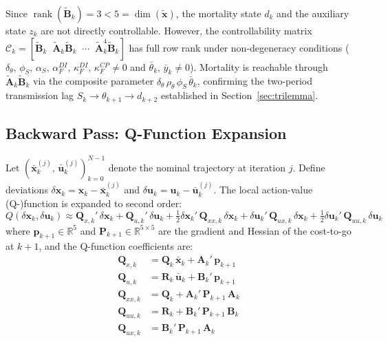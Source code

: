 \documentclass[12pt, a4paper]{article}
\begin{document}
Since $\operatorname{rank}(\tilde{\bm{B}}_k) = 3 < 5 = \dim(\tilde{\bm{x}})$,
the mortality state $d_k$ and the auxiliary state $z_k$ are not directly
controllable. However, the controllability matrix
$\mathcal{C}_k = [\tilde{\bm{B}}_k \;\; \tilde{\bm{A}}_k\tilde{\bm{B}}_k
\;\; \cdots \;\; \tilde{\bm{A}}_k^4\tilde{\bm{B}}_k]$ has full row rank under
non-degeneracy conditions ($\delta_\theta,\, \phi_S,\, \alpha_S,\,
\alpha_F^{DI},\, \kappa_F^{DI},\, \kappa_F^{CP} \neq 0$ and
$\bar{\theta}_k,\, \bar{y}_k \neq 0$). Mortality is reachable through
$\tilde{\bm{A}}_k\tilde{\bm{B}}_k$ via the composite parameter
$\delta_\theta\,\rho_\theta\,\phi_S\,\bar{\theta}_k$, confirming the
two-period transmission lag $S_k \to \theta_{k+1} \to d_{k+2}$ established in
Section~\ref{sec:trilemma}.



\subsection{Backward Pass: Q-Function Expansion}
\label{app:backward}

Let $(\bar{\bm{x}}_k^{(j)},\, \bar{\bm{u}}_k^{(j)})_{k=0}^{N-1}$ denote the
nominal trajectory at iteration $j$. Define deviations
$\delta\bm{x}_k = \bm{x}_k - \bar{\bm{x}}_k^{(j)}$ and
$\delta\bm{u}_k = \bm{u}_k - \bar{\bm{u}}_k^{(j)}$. The local action-value
(Q-)function is expanded to second order:
%
\begin{equation}
    Q(\delta\bm{x}_k, \delta\bm{u}_k) \approx
    \bm{Q}_{x,k}'\,\delta\bm{x}_k
    + \bm{Q}_{u,k}'\,\delta\bm{u}_k
    + \tfrac{1}{2}\delta\bm{x}_k'\,\bm{Q}_{xx,k}\,\delta\bm{x}_k
    + \delta\bm{u}_k'\,\bm{Q}_{ux,k}\,\delta\bm{x}_k
    + \tfrac{1}{2}\delta\bm{u}_k'\,\bm{Q}_{uu,k}\,\delta\bm{u}_k
    \label{eq:Qfunc}
\end{equation}
%
where $\bm{p}_{k+1} \in \mathbb{R}^5$ and
$\bm{P}_{k+1} \in \mathbb{R}^{5 \times 5}$ are the gradient and Hessian of the
cost-to-go at $k+1$, and the Q-function coefficients are:
%
\begin{align}
    \bm{Q}_{x,k}  &= \bm{Q}_k\,\bar{\bm{x}}_k + \bm{A}_k'\,\bm{p}_{k+1}
    \label{eq:Qx} \\[4pt]
    \bm{Q}_{u,k}  &= \bm{R}_k\,\bar{\bm{u}}_k + \bm{B}_k'\,\bm{p}_{k+1}
    \label{eq:Qu} \\[4pt]
    \bm{Q}_{xx,k} &= \bm{Q}_k + \bm{A}_k'\,\bm{P}_{k+1}\,\bm{A}_k
    \label{eq:Qxx} \\[4pt]
    \bm{Q}_{uu,k} &= \bm{R}_k + \bm{B}_k'\,\bm{P}_{k+1}\,\bm{B}_k
    \label{eq:Quu} \\[4pt]
    \bm{Q}_{ux,k} &= \bm{B}_k'\,\bm{P}_{k+1}\,\bm{A}_k
    \label{eq:Qux}
\end{align}
\end{document}
